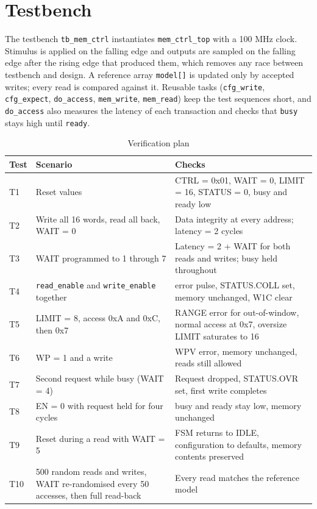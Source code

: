 \documentclass[11pt,a4paper]{article}
\newcommand{\sig}[1]{\texttt{#1}}
\begin{document}
\section{Testbench}
The testbench \sig{tb\_mem\_ctrl} instantiates \sig{mem\_ctrl\_top} with a 100 MHz clock. Stimulus is applied on the falling edge and outputs are sampled on the falling edge after the rising edge that produced them, which removes any race between testbench and design. A reference array \sig{model[]} is updated only by accepted writes; every read is compared against it. Reusable tasks (\sig{cfg\_write}, \sig{cfg\_expect}, \sig{do\_access}, \sig{mem\_write}, \sig{mem\_read}) keep the test sequences short, and \sig{do\_access} also measures the latency of each transaction and checks that \sig{busy} stays high until \sig{ready}.

\begin{table}[H]
\centering
\caption{Verification plan}
\label{tab:plan}
\small
\begin{tabularx}{\textwidth}{@{}l X X@{}}
\toprule
\textbf{Test} & \textbf{Scenario} & \textbf{Checks} \\
\midrule
T1 & Reset values & CTRL = 0x01, WAIT = 0, LIMIT = 16, STATUS = 0, busy and ready low \\
T2 & Write all 16 words, read all back, WAIT = 0 & Data integrity at every address; latency = 2 cycles \\
T3 & WAIT programmed to 1 through 7 & Latency = 2 + WAIT for both reads and writes; busy held throughout \\
T4 & \sig{read\_enable} and \sig{write\_enable} together & error pulse, STATUS.COLL set, memory unchanged, W1C clear \\
T5 & LIMIT = 8, access 0xA and 0xC, then 0x7 & RANGE error for out-of-window, normal access at 0x7, oversize LIMIT saturates to 16 \\
T6 & WP = 1 and a write & WPV error, memory unchanged, reads still allowed \\
T7 & Second request while busy (WAIT = 4) & Request dropped, STATUS.OVR set, first write completes \\
T8 & EN = 0 with request held for four cycles & busy and ready stay low, memory unchanged \\
T9 & Reset during a read with WAIT = 5 & FSM returns to IDLE, configuration to defaults, memory contents preserved \\
T10 & 500 random reads and writes, WAIT re-randomised every 50 accesses, then full read-back & Every read matches the reference model \\
\bottomrule
\end{tabularx}
\end{table}
\end{document}
